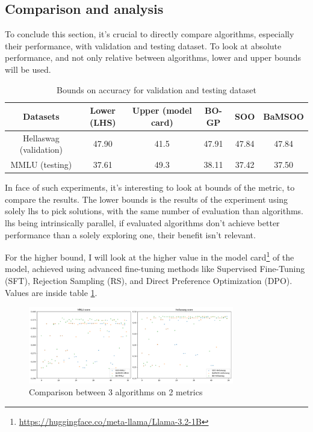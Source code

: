 \subsection{Comparison and analysis}
\label{sec:exp_analysis}
To conclude this section, it's crucial to directly compare algorithms, especially their performance, with validation and testing dataset. To look at absolute performance, and not only relative between algorithms, lower and upper bounds will be used. 

\begin{table}[h!]
    \centering
    \begin{tabular}{|c||c|c||c|c|c|}
    \hline
       Datasets  & Lower (LHS) & Upper (model card) & BO-GP & SOO & BaMSOO \\
    \hline
       Hellaswag (validation)  & 47.90 & 41.5 & 47.91 & 47.84 & 47.84\\
       MMLU (testing) & 37.61 & 49.3 & 38.11 & 37.42 & 37.50 \\
    \hline
    \end{tabular}
    \caption{Bounds on accuracy for validation and testing dataset}
    \label{tab:bounds}
\end{table}
In face of such experiments, it's interesting to look at bounds of the metric, to compare the results. The lower bounds is the results of the experiment using solely \acrshort{lhs} to pick solutions, with the same number of evaluation than algorithms. \acrshort{lhs} being intrinsically parallel, if evaluated algorithms don't achieve better performance than a solely exploring one, their benefit isn't relevant. 

For the higher bound, I will look at the higher value in the model card\footnote{\url{https://huggingface.co/meta-llama/Llama-3.2-1B}} of the model, achieved using advanced fine-tuning methods like Supervised Fine-Tuning (SFT), Rejection Sampling (RS), and Direct Preference Optimization (DPO). Values are inside table \ref{tab:bounds}.

\begin{figure}[h]
    \centering
    \includegraphics[width=0.8\textwidth]{assets/img/chap_4/experiments/plots/global/comparison.png}
    \caption{Comparison between 3 algorithms on 2 metrics}
    \label{fig:global_compare}
\end{figure}


